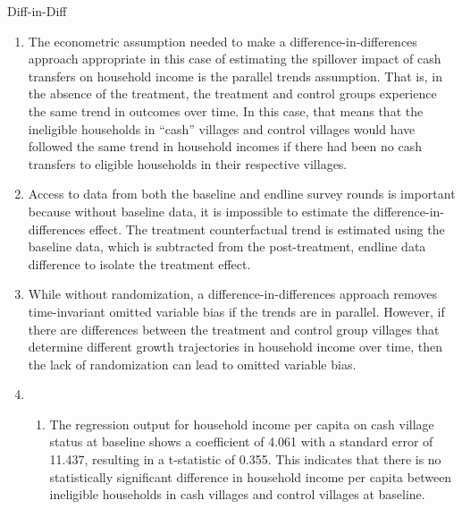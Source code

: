 \begin{homeworkProblem}{Diff-in-Diff}
    \begin{solution}
        \begin{enumerate}
            \item The econometric assumption needed to make a
                difference-in-differences approach appropriate in this case of
                estimating the spillover impact of cash transfers on household
                income is the parallel trends assumption. That is, in the 
                absence of the treatment, the treatment and control groups 
                experience the same trend in outcomes over time. In this case,
                that means that the ineligible households in ``cash'' villages
                and control villages would have followed the same trend in 
                household incomes if there had been no cash transfers to eligible
                households in their respective villages. 
            \item Access to data from both the baseline and endline survey
                rounds is important because without baseline data, it is 
                impossible to estimate the difference-in-differences effect. 
                The treatment counterfactual trend is estimated using the 
                baseline data, which is subtracted from the post-treatment,
                endline data difference to isolate the treatment effect.
            \item While without randomization, a difference-in-differences 
                approach removes time-invariant omitted variable bias if the
                trends are in parallel. However, if there are differences 
                between the treatment and control group villages that determine
                different growth trajectories in household income over time, then
                the lack of randomization can lead to omitted variable bias.
            \item \begin{enumerate}
                \item The regression output for household income per capita on
                    cash village status at baseline shows a coefficient of 
                    4.061 with a standard error of 11.437, resulting in a 
                    t-statistic of 0.355. This indicates that there is no 
                    statistically significant difference in household income 
                    per capita between ineligible households in cash villages
                    and control villages at baseline.


\end{enumerate}
\end{enumerate}
\end{solution}
\end{homeworkProblem}
